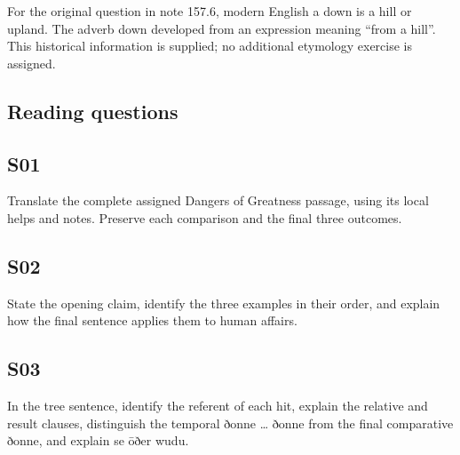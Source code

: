For the original question in note 157.6, modern English a down is a hill or upland. The adverb down developed from an expression meaning “from a hill”. This historical information is supplied; no additional etymology exercise is assigned.

\subsection*{Reading questions}

\par\begin{minipage}{\linewidth}\raggedright
\subsection*{S01}

Translate the complete assigned Dangers of Greatness passage, using its local helps and notes. Preserve each comparison and the final three outcomes.

\end{minipage}\par\addvspace{4pt}

\par\begin{minipage}{\linewidth}\raggedright
\subsection*{S02}

State the opening claim, identify the three examples in their order, and explain how the final sentence applies them to human affairs.

\end{minipage}\par\addvspace{4pt}

\par\begin{minipage}{\linewidth}\raggedright
\subsection*{S03}

In the tree sentence, identify the referent of each hit, explain the relative and result clauses, distinguish the temporal ðonne … ðonne from the final comparative ðonne, and explain se ōðer wudu.

\end{minipage}\par\addvspace{4pt}

